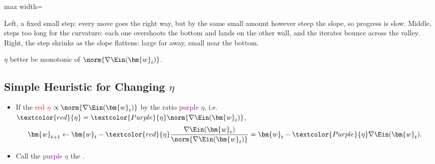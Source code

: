 \begin{center}
\begin{adjustbox}{max width=\textwidth}
    \end{adjustbox}
\end{center}

Left, a fixed small step: every move goes the right way, but by the same
small amount however steep the slope, so progress is slow. Middle, steps too
long for the curvature: each one overshoots the bottom and lands on the other
wall, and the iterates bounce across the valley. Right, the step shrinks as
the slope flattens: large far away, small near the bottom.

\begin{moral}
    \(\eta\) better be monotonic of \(\norm{\nabla \Ein(\bm{w}_t)}\).
\end{moral}

\subsection{Simple Heuristic for Changing \texorpdfstring{\(\eta\)}{eta}}

\begin{itemize}
    \item If the \textcolor{red}{red \(\eta\)} \(\propto \norm{\nabla
        \Ein(\bm{w}_t)}\) by the ratio \textcolor{Purple}{purple \(\eta\)},
        i.e.\
        \(\textcolor{red}{\eta} = \textcolor{Purple}{\eta} \norm{\nabla
        \Ein(\bm{w}_t)}\),
        \[
            \bm{w}_{t+1} \gets \bm{w}_t - \textcolor{red}{\eta} \frac{\nabla
            \Ein(\bm{w}_t)}{\norm{\nabla \Ein(\bm{w}_t)}}
            = \bm{w}_t - \textcolor{Purple}{\eta} \nabla \Ein(\bm{w}_t) .
        \]
    \item Call the \textcolor{Purple}{purple \(\eta\)} the \vocab{fixed
        learning rate}.
\end{itemize}

